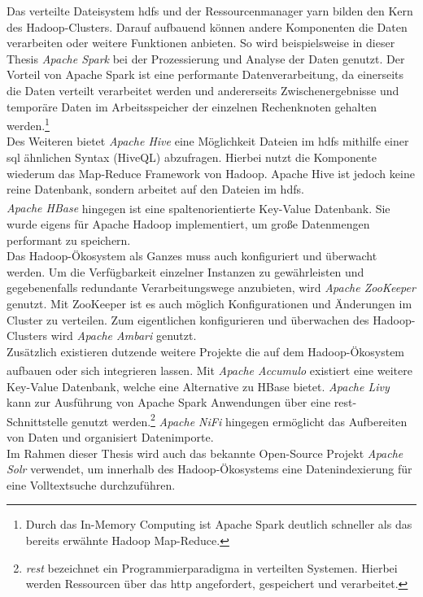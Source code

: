 \noindent
Das verteilte Dateisystem \gls{hdfs} und der Ressourcenmanager \acrshort{yarn} bilden den Kern des Hadoop-Clusters. Darauf aufbauend können andere Komponenten die Daten verarbeiten oder weitere Funktionen anbieten.
So wird beispielsweise in dieser Thesis \textit{Apache Spark\texttrademark\thinspace} bei der Prozessierung und Analyse der Daten genutzt. Der Vorteil von Apache Spark ist eine performante Datenverarbeitung, da einerseits die Daten verteilt verarbeitet werden und andererseits Zwischenergebnisse und temporäre Daten im Arbeitsspeicher der einzelnen Rechenknoten gehalten werden.\footnote{Durch das In-Memory Computing ist Apache Spark deutlich schneller als das bereits erwähnte Hadoop Map-Reduce.}\\
Des Weiteren bietet \textit{Apache Hive\texttrademark\thinspace} eine Möglichkeit Dateien im \gls{hdfs} mithilfe einer \acrshort{sql} ähnlichen Syntax (HiveQL) abzufragen. Hierbei nutzt die Komponente wiederum das Map-Reduce Framework von Hadoop. Apache Hive ist jedoch keine reine Datenbank, sondern arbeitet auf den Dateien im \gls{hdfs}.\\
\textit{Apache HBase\textsuperscript{\textregistered}} hingegen ist eine spaltenorientierte Key-Value Datenbank. Sie wurde eigens für Apache Hadoop implementiert, 
um große Datenmengen performant zu speichern.\\

\noindent
Das Hadoop-Ökosystem als Ganzes muss auch konfiguriert und überwacht werden. Um die Verfügbarkeit einzelner Instanzen zu gewährleisten und gegebenenfalls redundante Verarbeitungswege anzubieten, wird \textit{Apache ZooKeeper\texttrademark\thinspace} genutzt. Mit ZooKeeper ist es auch möglich Konfigurationen und Änderungen im Cluster zu verteilen. Zum eigentlichen konfigurieren und überwachen des Hadoop-Clusters wird \textit{Apache Ambari\texttrademark\thinspace} genutzt.\\

\noindent
Zusätzlich existieren dutzende weitere Projekte die auf dem Hadoop-Ökosystem aufbauen oder sich integrieren lassen. Mit \textit{Apache Accumulo\textsuperscript{\textregistered}} existiert eine weitere Key-Value Datenbank, welche eine Alternative zu HBase bietet. \textit{Apache Livy} kann zur Ausführung von Apache Spark Anwendungen über eine \acrshort{rest}-Schnittstelle genutzt werden.\footnote{\textit{\gls{rest}} bezeichnet ein Programmierparadigma in verteilten Systemen. Hierbei werden Ressourcen über das \gls{http} angefordert, gespeichert und verarbeitet.} \textit{Apache NiFi} hingegen ermöglicht das Aufbereiten von Daten und organisiert Datenimporte.\\
Im Rahmen dieser Thesis wird auch das bekannte Open-Source Projekt \textit{Apache Solr\texttrademark\thinspace} verwendet, um innerhalb des Hadoop-Ökosystems eine Datenindexierung für eine Volltextsuche durchzuführen.\\


